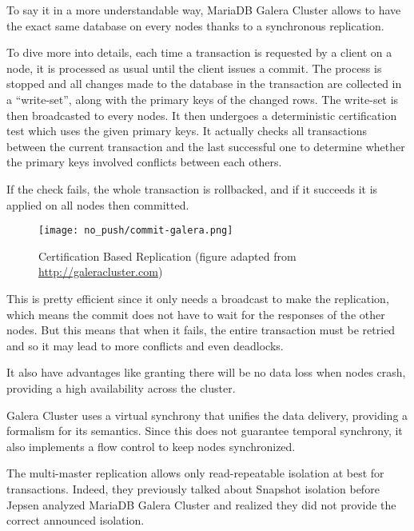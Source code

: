 To say it in a more understandable way, MariaDB Galera Cluster allows to have the exact same database on every nodes thanks to a synchronous replication.

To dive more into details, each time a transaction is requested by a client on a node, it is processed as usual until the client issues a commit. The process is stopped and all changes made to the database in the transaction are collected in a ``write-set'', along with the primary keys of the changed rows. The write-set is then broadcasted to every nodes. It then undergoes a deterministic certification test which uses the given primary keys. It actually checks all transactions between the current transaction and the last successful one to determine whether the primary keys involved conflicts between each others.

If the check fails, the whole transaction is rollbacked, and if it succeeds it is applied on all nodes then committed.

\begin{figure}[H]
  \vspace{-10pt}
  \centering
  \centerline{\texttt{[image: no\_push/commit-galera.png]}}
  \vspace{-5pt}
  \caption{Certification Based Replication (figure adapted from \url{http://galeracluster.com}) }
  \vspace{-5pt}
  \label{fig:certificationcommit}
\end{figure}


This is pretty efficient since it only needs a broadcast to make the replication, which means the commit does not have to wait for the responses of the other nodes. But this means that when it fails, the entire transaction must be retried and so it may lead to more conflicts and even deadlocks.

It also have advantages like granting there will be no data loss when nodes crash, providing a high availability across the cluster.

Galera Cluster uses a virtual synchrony that unifies the data delivery, providing a formalism for its semantics. Since this does not guarantee temporal synchrony, it also implements a flow control to keep nodes synchronized.

The multi-master replication allows only read-repeatable isolation at best for transactions. Indeed, they previously talked about Snapshot isolation before Jepsen analyzed MariaDB Galera Cluster and realized they did not provide the correct announced isolation\cite{MGC:jepsen}.


